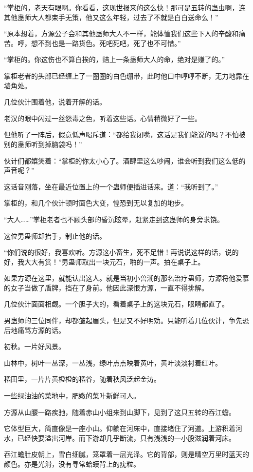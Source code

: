 \begin{this_body}
“掌柜的，老天有眼啊。你看看，这现世报来的这么快！那可是五转的蛊虫啊，连其他蛊师大人都束手无策，他又这么年轻，过去了不就是白白送命么！”

“原本想着，方源公子会和其他蛊师大人不一样，能体恤我们这些下人的辛酸和痛苦。哼，想不到也是一路货色。死吧死吧，死了也不可惜。”

“掌柜的。你这伤也不算白挨的，赔上一条蛊师大人的命，绝对是赚了的。”

掌柜老者的头部已经缠上了一圈圈的白色绷带，此时他口中哼哼不断，无力地靠在墙角处。

几位伙计围着他，说着开解的话。

老汉的眼中闪过一丝怨毒之色，听着这些话。心情稍微好了一些。

但他听了一阵后，假意低声喝斥道：“都给我闭嘴，这话是我们能说的吗？不怕被别的蛊师听到掉脑袋吗！”

伙计们都嬉笑着：“掌柜的你太小心了。酒肆里这么吵闹，谁会听到我们这么低的声音呢？”

这话音刚落，坐在最近位置上的一个蛊师便插进话来。道：“我听到了。”

掌柜的，和几个伙计顿时面色大变，惶恐到无以复加的地步。

“大人……”掌柜老者也不顾头部的昏沉眩晕，赶紧走到这蛊师的身旁求饶。

这位男蛊师却抬手，制止他的话。

“你们说的很好，我喜欢听。方源这小畜生，死不足惜！再说说这样的话，说的好，我大大有赏！”男蛊师取出一块元石，啪的一声。拍在桌子上。

如果方源在这里，就能认出这人。就是当初小兽潮的那名治疗蛊师，方源将他爱慕的女子当做了盾牌，挡在了身前。他因此深恨方源，一直不得排解。

几位伙计面面相觑。一个胆子大的，看着桌子上的这块元石，眼睛都直了。

男蛊师的三位同伴，却都皱起眉头，但是又不好明劝。只能听着几位伙计，争先恐后地痛骂方源的话。

初秋。一片好风景。

山林中，树叶一丛深，一丛浅，绿叶点点映着黄叶，黄叶淡淡衬着红叶。

稻田里，一片片黄橙橙的稻谷，随着秋风泛起金涛。

一些绿油油的菜地中，肥嫩的菜叶新鲜可人。

方源从山腰一路疾驰，随着赤山小组来到山脚下，见到了这只五转的吞江蟾。

它体型巨大，简直像是一座小山。仰躺在河床中，直接堵住了河道。上游积着河水，已经快要溢出河岸。而下游却几乎断流，只有浅浅的一小股滋润着河床。

吞江蟾肚皮朝上，雪白细腻，笼罩着一层光泽。它的背部，则是晴空万里时蓝天的颜色。亦是光滑，没有寻常蛤蟆背上的疣粒。


\end{this_body}
